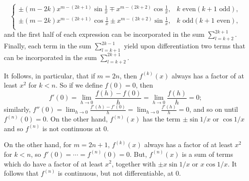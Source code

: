 \documentclass{article}
\begin{document}
\begin{equation*}
  \begin{cases}
    \pm(m - 2k)x^{m - (2k + 1)}\sin{\frac{1}{x}} \mp x^{m - (2k + 2)}\cos{
      \frac{1}{x}}, &k \text{ even} (k + 1 \text{ odd}), \\
    \pm(m - 2k)x^{m - (2k + 1)}\cos{\frac{1}{x}} \pm x^{m - (2k + 2)}\sin{
      \frac{1}{x}}, &k \text{ odd} (k + 1 \text{ even}), \\
  \end{cases}
\end{equation*} and the first half of each expression can be incorporated in
the sum $\sum_{l = k + 2}^{2k + 1}$. Finally, each term in the sum $\sum_{l = k
+ 1}^{2k - 1}$ yield upon differentiation two terms that can be incorporated in
the sum $\sum_{l = k + 2}^{2k + 1}$.

It follows, in particular, that if $m = 2n$, then $f^{(k)}(x)$ always has a
factor of at least $x^2$ for $k < n$. So if we define $f(0) = 0$, then
\begin{equation*}
  f'(0) = \lim_{h \rightarrow 0}\frac{f(h) - f(0)}{h}= \lim_{h \rightarrow 0}
    \frac{f(h)}{h} = 0;
\end{equation*} similarly, $f''(0) = \lim_{h \rightarrow 0}\frac{f'(h) - f'(0)}
{h} = \lim_{h \rightarrow 0}\frac{f'(h)}{h} = 0$, and so on until $f^{(n)}(0) =
0$. On the other hand, $f^{(n)}(x)$ has the term $\pm \sin{1/x}$ or $\cos{1/x}$
and so $f^{(n)}$ is not continuous at 0.

On the other hand, for $m = 2n + 1$, $f^{(k)}(x)$ always has a factor of at
least $x^2$ for $k < n$, so $f'(0) = \cdots = f^{(n)}(0) = 0$. But,
$f^{(n)}(x)$ is a sum of terms which do have a factor of at least $x^2$,
together with $\pm x\sin{1/x}$ or $x\cos{1/x}$. It follows that $f^{(n)}$ is
continuous, but not differentiable, at 0.
\end{document}
